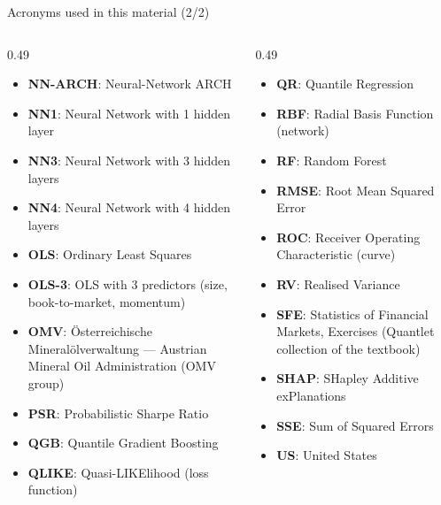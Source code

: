 \begin{frame}{Acronyms used in this material (2/2)}
\begin{columns}[T]
\begin{column}{0.49\textwidth}
\begin{itemize}\setlength{\itemsep}{0pt}
    \item \textbf{NN-ARCH}: Neural-Network ARCH
    \item \textbf{NN1}: Neural Network with 1 hidden layer
    \item \textbf{NN3}: Neural Network with 3 hidden layers
    \item \textbf{NN4}: Neural Network with 4 hidden layers
    \item \textbf{OLS}: Ordinary Least Squares
    \item \textbf{OLS-3}: OLS with 3 predictors (size, book-to-market, momentum)
    \item \textbf{OMV}: Österreichische Mineralölverwaltung — Austrian Mineral Oil Administration (OMV group)
    \item \textbf{PSR}: Probabilistic Sharpe Ratio
    \item \textbf{QGB}: Quantile Gradient Boosting
    \item \textbf{QLIKE}: Quasi-LIKElihood (loss function)
\end{itemize}
\end{column}
\begin{column}{0.49\textwidth}
\begin{itemize}\setlength{\itemsep}{0pt}
    \item \textbf{QR}: Quantile Regression
    \item \textbf{RBF}: Radial Basis Function (network)
    \item \textbf{RF}: Random Forest
    \item \textbf{RMSE}: Root Mean Squared Error
    \item \textbf{ROC}: Receiver Operating Characteristic (curve)
    \item \textbf{RV}: Realised Variance
    \item \textbf{SFE}: Statistics of Financial Markets, Exercises (Quantlet collection of the textbook)
    \item \textbf{SHAP}: SHapley Additive exPlanations
    \item \textbf{SSE}: Sum of Squared Errors
    \item \textbf{US}: United States
\end{itemize}
\end{column}
\end{columns}
\end{frame}

